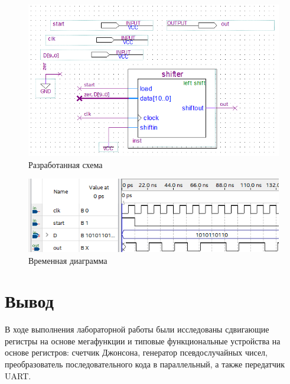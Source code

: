 \documentclass[a4paper,12pt]{article}
\begin{document}
    \begin{figure}[H]
        \centering
        \includegraphics[width=\linewidth]{scheme6}
        \caption{Разработанная схема}
    \end{figure}
    \begin{figure}[H]
        \centering
        \includegraphics[width=\linewidth]{wave6}
        \caption{Временная диаграмма}
    \end{figure}
    
    \section{Вывод}
    В ходе выполнения лабораторной работы были исследованы сдвигающие
    регистры на основе мегафункции и типовые функциональные устройства на основе регистров:
    счетчик Джонсона, генератор псевдослучайных чисел, преобразователь последовательного
    кода в параллельный, а также передатчик UART.
\end{document}
